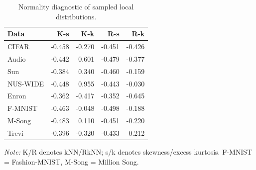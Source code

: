 \begin{table}[t]
\centering
\caption{Normality diagnostic of sampled local distributions.}
\label{tab:normality-diagnostic}
\footnotesize
\begin{tabular*}{\columnwidth}{@{\extracolsep{\fill}}lrrrr@{}}
\toprule
\textbf{Data} & \textbf{K-s} & \textbf{K-k} & \textbf{R-s} & \textbf{R-k} \\
\midrule
CIFAR          & -0.458 & -0.270 & -0.451 & -0.426 \\
Audio          & -0.442 &  0.601 & -0.479 & -0.377 \\
Sun            & -0.384 &  0.340 & -0.460 & -0.159 \\
NUS-WIDE       & -0.448 &  0.955 & -0.443 & -0.030 \\
Enron          & -0.362 & -0.417 & -0.352 & -0.645 \\
F-MNIST        & -0.463 & -0.048 & -0.498 & -0.188 \\
M-Song         & -0.483 &  0.110 & -0.451 & -0.220 \\
Trevi          & -0.396 & -0.320 & -0.433 &  0.212 \\
\bottomrule
\end{tabular*}
\vspace{0.2em}
\begin{minipage}{\columnwidth}
\footnotesize
\emph{Note:} K/R denotes kNN/RkNN; s/k denotes skewness/excess kurtosis. F-MNIST = Fashion-MNIST, M-Song = Million Song.
\end{minipage}
\end{table}
